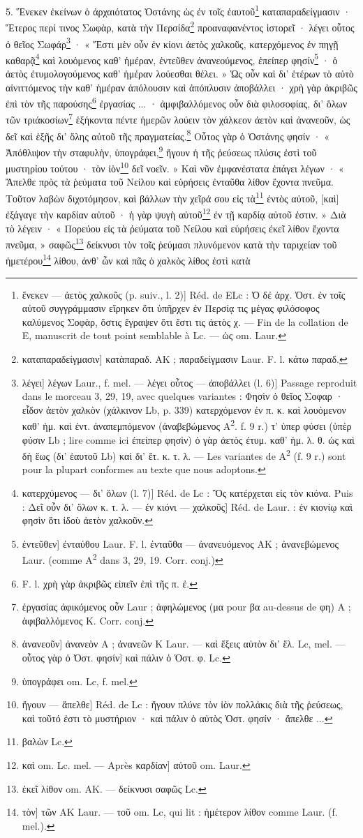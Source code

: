 \documentclass[landscape, a4paper, 11pt, oneside, polutonikogreek, french]{article}
\begin{document}
5. Ἕνεκεν ἐκείνων ὁ ἀρχαιότατος Ὀστάνης ὡς ἐν τοῖς ἑαυτοῦ\footnote{ἕνεκεν --- ἀετὸς χαλκοῦς (p. suiv., l. 2)] Réd. de ELc : Ὁ δἐ ἀρχ. Ὀστ. ἐν τοῖς αὐτοῦ συγγράμμασιν εἴρηκεν ὅτι ὑπῆρχεν ἐν Περσίᾳ τις μέγας φιλόσοφος καλύμενος Σοφὰρ, ὅστις ἔγραψεν ὅτι ἔστι τις ἀετὸς χ. --- Fin de la collation de E, manuscrit de tout point semblable à Lc. --- ὡς om. Laur.} καταπαραδείγμασιν · Ἕτερος περί τινος Σωφὰρ, κατὰ τὴν Περσίδα\footnote{καταπαραδείγμασιν] κατὰπαραδ. AΚ ; παραδείγμασιν Laur. F. l. κάτω παραδ.} προαναφανέντος ἱστορεῖ · λέγει οὗτος ὀ θεῖος Σωφάρ\footnote{λέγει] λέγων Laur., f. mel. --- λέγει οὖτος --- ἀποβάλλει (l. 6)] Passage reproduit dans le morceau 3, 29, 19, avec quelques variantes : Φησὶν ὁ θεῖος Σοφαρ · εἶδον ἀετὸν χαλκὸν (χάλκινον Lb, p. 339) κατερχόμενον ἐν π. κ. καὶ λουόμενον καθ' ἡμ. καὶ ἐντ. ἀναπεμπόμενον (ἀναβεβώμενος A\textsuperscript{2}. f. 9 r.) τ' ὑπερ φύσει (ὑπὲρ φύσιν Lb ; lire comme ici ἐπείπερ φησὶν) ὁ γὰρ ἀετὸς ἐτυμ. καθ' ἡμ. λ. θ. ὡς καὶ δὴ ἕως (δι' ἑαυτοῦ Lb) καὶ δι' ἕτ. κ. τ. λ. --- Les variantes de A\textsuperscript{2} (f. 9 r.) sont pour la plupart conformes au texte que nous adoptons.} · « Ἔστι μὲν οὖν ἐν κίονι ἀετὸς χαλκοῦς, κατερχόμενος ἐν πηγῇ καθαρᾷ\footnote{κατερχύμενος --- δι' ὅλων (l. 7)] Réd. de Lc : Ὃς κατέρχεται εἰς τὸν κιόνα. Puis : Δεῖ οὖν δι' ὅλων κ. τ. λ. --- ἐν κιόνι --- χαλκοῦς] Réd. de Laur. : ἐν κιονίῳ καὶ φησὶν ὅτι ἰδοὺ ἀετὸν χαλκοῦν.} καὶ λουόμενος καθ' ἡμέραν, ἐντεῦθεν ἀνανεούμενος, ἐπείπερ φησίν\footnote{ἐντεῦθεν] ἐνταύθου Laur. F. l. ἐνταῦθα --- ἀνανευόμενος AΚ ; ἀνανεβώμενος Laur. (comme A\textsuperscript{2} dans 3, 29, 19. Corr. conj.)} · ὁ ἀετὸς ἐτυμολογούμενος καθ' ἡμέραν λούεσθαι θέλει. » Ὡς οὖν καὶ δι' ἑτέρων τὸ αὐτὸ αἰνιττόμενος τὴν καθ' ἡμέραν ἀπόλουσιν καὶ ἀπόπλυσιν ἀποβάλλει · χρὴ γὰρ ἀκριβῶς ἐπὶ τὸν τῆς παρούσης\footnote{F. l. χρὴ γὰρ ἀκριβῶς εἰπεῖν ἐπὶ τῆς π. ἐ.} ἐργασίας ... · ἀμφιβαλλόμενος οὖν διὰ φιλοσοφίας, δι' ὅλων τῶν τριάκοσίων\footnote{ἐργασίας ἀφικόμενος οὖν Laur ; ἀφηλώμενος (μα pour βα au-dessus de φη) A ; ἀφιβαλλόμενος K. Corr. conj.} ἑξήκοντα πέντε ἡμερῶν λούειν τὸν χάλκεον ἀετὸν καὶ ἀνανεοῦν, ὡς δεῖ καὶ ἑξῆς δι' ὅλης αὐτοῦ τῆς πραγματείας.\footnote{ἀνανεοῦν] ἀνανεὸν A ; ἀνανεῶν Κ Laur. --- καὶ ἕξεις αὐτὸν δι' ἕλ. Lc, mel. --- οὗτος γὰρ ὁ Ὀστ. φησίν] καὶ πάλιν ὁ Ὁστ.  φ. Lc.} Οὗτος γὰρ ὁ Ὀστάνης φησίν · « Ἀπόθλιψον τὴν σταφυλὴν, ὑπογράφει,\footnote{ὑπογράφει om. Lc, f. mel.} ἤγουν ἡ τῆς ῥεύσεως πλύσις ἐστὶ τοῦ μυστηρίου τούτου · τὸν ἰὸν\footnote{ἤγουν --- ἄπελθε] Réd. de Lc : ἤγουν πλύνε τὸν ἰὸν πολλάκις διὰ τῆς ῥεύσεως, καὶ τοῦτό ἐστι τὸ μυστήριον · καὶ πάλιν ὁ αὐτὸς Ὁστ. φησίν · ἄπελθε ...} δεῖ νοεῖν. » Καὶ νῦν ἐμφανέστατα ἐπάγει λέγων · « Ἄπελθε πρὸς τὰ ῥεύματα τοῦ Νείλου καὶ εὑρήσεις ἐνταῦθα λίθον ἔχοντα πνεῦμα. Τοῦτον λαβὼν διχοτόμησον, καὶ βάλλων τὴν χεῖρά σου εἰς τὰ\footnote{βαλὼν Lc.} ἐντὸς αὐτοῦ, [καὶ] ἐξάγαγε τὴν καρδίαν αὐτοῦ · ἡ γὰρ ψυγὴ αὐτοῦ\footnote{καὶ om. Lc. mel. --- Après καρδίαν] αὐτοῦ om. Laur.} ἐν τῇ καρδίᾳ αὐτοῦ ἐστιν. » Διὰ τὸ λέγειν · « Πορεύου εἰς τὰ ῥεύματα τοῦ Νείλου καὶ εὑρήσεις ἐκεῖ λίθον ἔχοντα πνεῦμα, » σαφῶς\footnote{ἐκεῖ λίθον om. AK. --- δείκνυσι σαφῶς Lc.} δείκνυσι τὸν τοῖς ῥεύμασι πλυνόμενον κατὰ τὴν ταριχείαν τοῦ ἡμετέρου\footnote{τὸν] τῶν AK Laur. --- τοῦ om. Lc, qui lit : ἡμέτερον λίθον comme Laur. (f. mel.).} λίθου, ἀνθ' ὧν καὶ πᾶς ὁ χαλκὸς λίθος ἐστὶ κατὰ 
\end{document}
